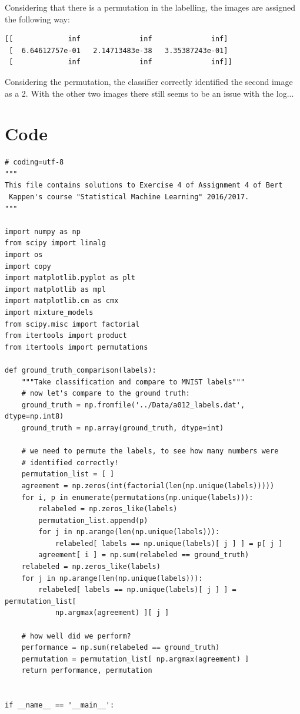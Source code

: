 Considering that there is a permutation in the labelling, the images are assigned the following way:
\begin{verbatim}
[[             inf              inf              inf]
 [  6.64612757e-01   2.14713483e-38   3.35387243e-01]
 [             inf              inf              inf]]
\end{verbatim}
Considering the permutation, the classifier correctly identified the second image as a 2. With the other two images there still seems to be an issue with the log...

\newpage
\section{Code}
\begin{verbatim}
# coding=utf-8
"""
This file contains solutions to Exercise 4 of Assignment 4 of Bert
 Kappen's course "Statistical Machine Learning" 2016/2017.
"""

import numpy as np
from scipy import linalg
import os
import copy
import matplotlib.pyplot as plt
import matplotlib as mpl
import matplotlib.cm as cmx
import mixture_models
from scipy.misc import factorial
from itertools import product
from itertools import permutations

def ground_truth_comparison(labels):
    """Take classification and compare to MNIST labels"""
    # now let's compare to the ground truth:
    ground_truth = np.fromfile('../Data/a012_labels.dat', dtype=np.int8)
    ground_truth = np.array(ground_truth, dtype=int)

    # we need to permute the labels, to see how many numbers were
    # identified correctly!
    permutation_list = [ ]
    agreement = np.zeros(int(factorial(len(np.unique(labels)))))
    for i, p in enumerate(permutations(np.unique(labels))):
        relabeled = np.zeros_like(labels)
        permutation_list.append(p)
        for j in np.arange(len(np.unique(labels))):
            relabeled[ labels == np.unique(labels)[ j ] ] = p[ j ]
        agreement[ i ] = np.sum(relabeled == ground_truth)
    relabeled = np.zeros_like(labels)
    for j in np.arange(len(np.unique(labels))):
        relabeled[ labels == np.unique(labels)[ j ] ] = permutation_list[
            np.argmax(agreement) ][ j ]

    # how well did we perform?
    performance = np.sum(relabeled == ground_truth)
    permutation = permutation_list[ np.argmax(agreement) ]
    return performance, permutation


if __name__ == '__main__':


\end{verbatim}
